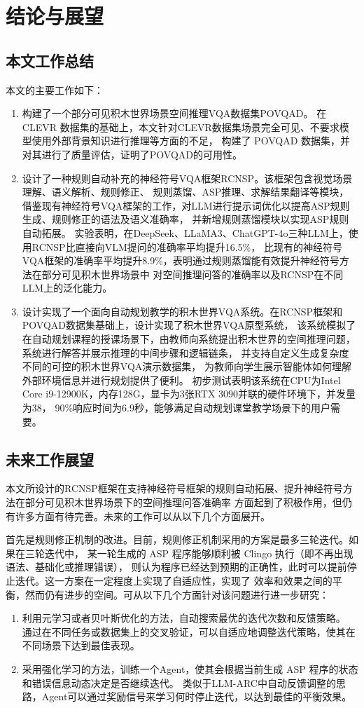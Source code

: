 \chapter{结论与展望}
\section{本文工作总结}
本文的主要工作如下：
\begin{enumerate}[nosep]
\item 构建了一个部分可见积木世界场景空间推理VQA数据集POVQAD。
在 CLEVR 数据集的基础上，本文针对CLEVR数据集场景完全可见、不要求模型使用外部背景知识进行推理等方面的不足，
构建了 POVQAD 数据集，并对其进行了质量评估，证明了POVQAD的可用性。
\item 设计了一种规则自动补充的神经符号VQA框架RCNSP。该框架包含视觉场景理解、语义解析、规则修正、
规则蒸馏、ASP推理、求解结果翻译等模块，借鉴现有神经符号VQA框架的工作，对LLM进行提示词优化以提高ASP规则生成、规则修正的语法及语义准确率，
并新增规则蒸馏模块以实现ASP规则自动拓展。
实验表明，在DeepSeek、LLaMA3、ChatGPT-4o三种LLM上，使用RCNSP比直接向VLM提问的准确率平均提升16.5\%，
比现有的神经符号VQA框架的准确率平均提升8.9\%，表明通过规则蒸馏能有效提升神经符号方法在部分可见积木世界场景中
对空间推理问答的准确率以及RCNSP在不同LLM上的泛化能力。
\item 设计实现了一个面向自动规划教学的积木世界VQA系统。在RCNSP框架和POVQAD数据集基础上，设计实现了积木世界VQA原型系统，
该系统模拟了在自动规划课程的授课场景下，由教师向系统提出积木世界的空间推理问题，系统进行解答并展示推理的中间步骤和逻辑链条，
并支持自定义生成复杂度不同的可控的积木世界VQA演示数据集，
为教师向学生展示智能体如何理解外部环境信息并进行规划提供了便利。
初步测试表明该系统在CPU为Intel Core i9-12900K，内存128G，显卡为3张RTX 3090并联的硬件环境下，并发量为38，
90\%响应时间为6.9秒，能够满足自动规划课堂教学场景下的用户需要。
\end{enumerate}
\section{未来工作展望}
本文所设计的RCNSP框架在支持神经符号框架的规则自动拓展、提升神经符号方法在部分可见积木世界场景下的空间推理问答准确率
方面起到了积极作用，但仍有许多方面有待完善。未来的工作可以从以下几个方面展开。

首先是规则修正机制的改进。目前，规则修正机制采用的方案是最多三轮迭代。如果在三轮迭代中，
某一轮生成的 ASP 程序能够顺利被 Clingo 执行（即不再出现语法、基础化或推理错误），
则认为程序已经达到预期的正确性，此时可以提前停止迭代。这一方案在一定程度上实现了自适应性，实现了
效率和效果之间的平衡，然而仍有进步的空间。可从以下几个方面针对该问题进行进一步研究：
\begin{enumerate}[nosep]
    \item 利用元学习或者贝叶斯优化的方法，自动搜索最优的迭代次数和反馈策略。
通过在不同任务或数据集上的交叉验证，可以自适应地调整迭代策略，使其在不同场景下达到最佳表现。
    \item 采用强化学习的方法，训练一个Agent，使其会根据当前生成 ASP 程序的状态和错误信息动态决定是否继续迭代。
类似于LLM-ARC中自动反馈调整的思路，Agent可以通过奖励信号来学习何时停止迭代，以达到最佳的平衡效果\cite{kalyanpur2024llmarcenhancingllmsautomated}。
\end{enumerate}

